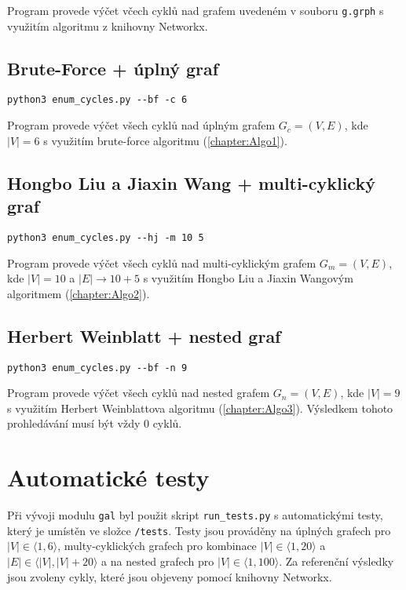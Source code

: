             \vspace*{0.5em}
            Program provede výčet včech cyklů nad grafem uvedeném v souboru \texttt{g.grph} s využitím algoritmu z knihovny Networkx.

        \subsection*{Brute-Force + úplný graf}
            \texttt{python3 enum\_cycles.py -{}-bf -c 6}

            \vspace*{0.5em}
            Program provede výčet všech cyklů nad úplným grafem $G_c = (V, E)$, kde $|V| = 6$ s využitím brute-force algoritmu (\ref{chapter:Algo1}).

        \subsection*{Hongbo Liu a Jiaxin Wang + multi-cyklický graf}
            \texttt{python3 enum\_cycles.py -{}-hj -m 10 5}

            \vspace*{0.5em}
            Program provede výčet všech cyklů nad multi-cyklickým grafem $G_m = (V, E)$, kde $|V| = 10$ a $|E| \rightarrow 10 + 5$ s využitím Hongbo Liu a Jiaxin Wangovým algoritmem (\ref{chapter:Algo2}).

        \subsection*{Herbert Weinblatt + nested graf}
            \texttt{python3 enum\_cycles.py -{}-bf -n 9}

            \vspace*{0.5em}
            Program provede výčet všech cyklů nad nested grafem $G_n = (V, E)$, kde $|V| = 9$ s využitím Herbert Weinblattova algoritmu (\ref{chapter:Algo3}). Výsledkem tohoto prohledávání musí být vždy 0 cyklů.

    \section{Automatické testy}
        Při vývoji modulu \texttt{gal} byl použit skript \texttt{run\_tests.py} s automatickými testy, který je umístěn ve složce \texttt{/tests}. Testy jsou prováděny na úplných grafech pro $|V| \in \langle 1, 6 \rangle$, multy-cyklických grafech pro kombinace $|V| \in \langle 1, 20 \rangle$ a $|E| \in \langle |V|, |V| + 20 \rangle$ a na nested grafech pro $|V| \in \langle 1, 100 \rangle$. Za referenční výsledky jsou zvoleny cykly, které jsou objeveny pomocí knihovny Networkx.

